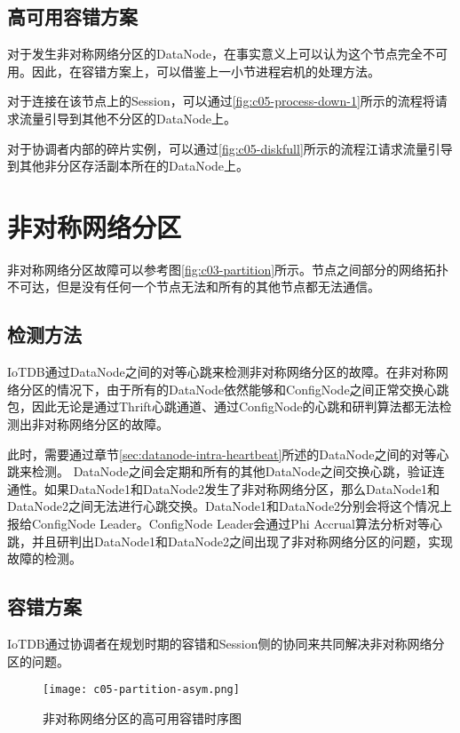 \subsection{高可用容错方案}

对于发生非对称网络分区的DataNode，在事实意义上可以认为这个节点完全不可用。因此，在容错方案上，可以借鉴上一小节进程宕机的处理方法。

对于连接在该节点上的Session，可以通过\ref{fig:c05-process-down-1}所示的流程将请求流量引导到其他不分区的DataNode上。

对于协调者内部的碎片实例，可以通过\ref{fig:c05-diskfull}所示的流程江请求流量引导到其他非分区存活副本所在的DataNode上。


\section{非对称网络分区}

非对称网络分区故障可以参考图\ref{fig:c03-partition}所示。节点之间部分的网络拓扑不可达，但是没有任何一个节点无法和所有的其他节点都无法通信。

\subsection{检测方法}

IoTDB通过DataNode之间的对等心跳来检测非对称网络分区的故障。在非对称网络分区的情况下，由于所有的DataNode依然能够和ConfigNode之间正常交换心跳包，因此无论是通过Thrift心跳通道、通过ConfigNode的心跳和研判算法都无法检测出非对称网络分区的故障。

此时，需要通过章节\ref{sec:datanode-intra-heartbeat}所述的DataNode之间的对等心跳来检测。
DataNode之间会定期和所有的其他DataNode之间交换心跳，验证连通性。如果DataNode1和DataNode2发生了非对称网络分区，那么DataNode1和DataNode2之间无法进行心跳交换。DataNode1和DataNode2分别会将这个情况上报给ConfigNode Leader。ConfigNode Leader会通过Phi Accrual算法分析对等心跳，并且研判出DataNode1和DataNode2之间出现了非对称网络分区的问题，实现故障的检测。


\subsection{容错方案}

IoTDB通过协调者在规划时期的容错和Session侧的协同来共同解决非对称网络分区的问题。

\begin{figure}
    \centering
    \texttt{[image: c05-partition-asym.png]}
    \caption{非对称网络分区的高可用容错时序图}
    \label{fig:c05-partition-asym}
\end{figure}

